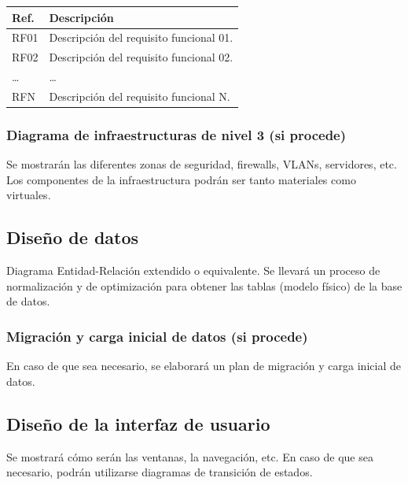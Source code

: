 \begin{table}[h]
    \centering
        \setlength{\arrayrulewidth}{0.05mm} %
        \begin{tabular}{|p{2cm}|p{10cm}|}
            \hline
            \textbf{Ref.} & \textbf{Descripción} \\
            \hline
            RF01 & Descripción del requisito funcional 01. \\
            \hline
            RF02 & Descripción del requisito funcional 02. \\
            \hline
            \ldots & \ldots \\
            \hline
            RFN & Descripción del requisito funcional N. \\
            \hline
        \end{tabular}
    \label{tab:coste_estimado_servicio}
\end{table}

\subsubsection{Diagrama de infraestructuras de nivel 3 (si procede)}
Se mostrarán las diferentes zonas de seguridad, firewalls, VLANs, servidores, etc. Los componentes de la infraestructura podrán ser tanto materiales como virtuales.


\subsection{Diseño de datos}
Diagrama Entidad-Relación extendido o equivalente. Se llevará un proceso de normalización y de optimización para obtener las tablas (modelo físico) de la base de datos.


\subsubsection{Migración y carga inicial de datos (si procede)}
En caso de que sea necesario, se elaborará un plan de migración y carga inicial de datos.

\subsection{Diseño de la interfaz de usuario}
Se mostrará cómo serán las ventanas, la navegación, etc. En caso de que sea necesario, podrán utilizarse diagramas de transición de estados.

